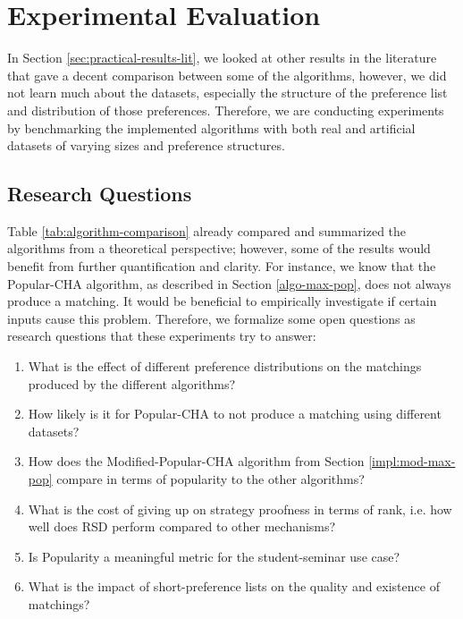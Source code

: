 \section{Experimental Evaluation}\label{sec:evaluation}
In Section \ref{sec:practical-results-lit}, we looked at other results in the literature that gave a decent comparison between some of the algorithms, however, we did not learn much about the datasets, especially the structure of the preference list and distribution of those preferences. Therefore, we are conducting experiments by benchmarking the implemented algorithms with both real and artificial datasets of varying sizes and preference structures.

\subsection{Research Questions}\label{sec:research-q}
Table \ref{tab:algorithm-comparison} already compared and summarized the algorithms from a theoretical perspective; however, some of the results would benefit from further quantification and clarity. For instance, we know that the Popular-CHA algorithm, as described in Section \ref{algo-max-pop}, does not always produce a matching. It would be beneficial to empirically investigate if certain inputs cause this problem. Therefore, we formalize some open questions as research questions that these experiments try to answer:
\begin{enumerate}
    \item What is the effect of different preference distributions on the matchings produced by the different algorithms?
    \item How likely is it for Popular-CHA to not produce a matching using different datasets?
    \item How does the Modified-Popular-CHA algorithm from Section \ref{impl:mod-max-pop} compare in terms of popularity to the other algorithms?
    \item What is the cost of giving up on strategy proofness in terms of rank, i.e. how well does RSD perform compared to other mechanisms?
    \item Is Popularity a meaningful metric for the student-seminar use case?
    \item What is the impact of short-preference lists on the quality and existence of matchings?
\end{enumerate}

